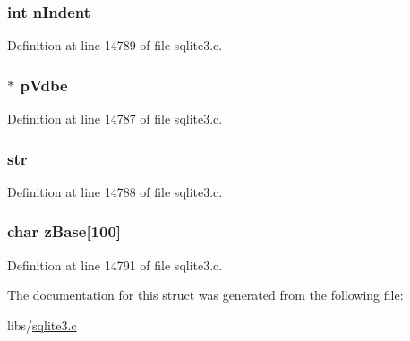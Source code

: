\hypertarget{struct_explain_a43e7d552ac028ebbf1aae378433fd8cb}{}
\subsubsection[{n\+Indent}]{\setlength{\rightskip}{0pt plus 5cm}int n\+Indent}\label{struct_explain_a43e7d552ac028ebbf1aae378433fd8cb}


Definition at line 14789 of file sqlite3.\+c.

\hypertarget{struct_explain_ac73302f0c912cb7b3c9b1cea509e6077}{}
\subsubsection[{p\+Vdbe}]{$\ast$ p\+Vdbe}\label{struct_explain_ac73302f0c912cb7b3c9b1cea509e6077}


Definition at line 14787 of file sqlite3.\+c.

\hypertarget{struct_explain_a3f400d3c4528e03aed89b006fe4923e1}{}
\subsubsection[{str}]{ str}\label{struct_explain_a3f400d3c4528e03aed89b006fe4923e1}


Definition at line 14788 of file sqlite3.\+c.

\hypertarget{struct_explain_a175ee71ac545913c8c3c5d9685b8f836}{}
\subsubsection[{z\+Base}]{\setlength{\rightskip}{0pt plus 5cm}char z\+Base\mbox{[}100\mbox{]}}\label{struct_explain_a175ee71ac545913c8c3c5d9685b8f836}


Definition at line 14791 of file sqlite3.\+c.



The documentation for this struct was generated from the following file\+:\begin{DoxyCompactItemize}
\item 
libs/\hyperlink{sqlite3_8c}{sqlite3.\+c}\end{DoxyCompactItemize}
